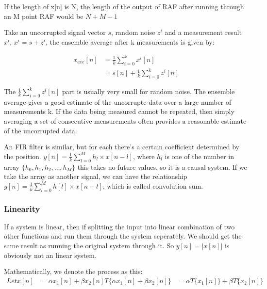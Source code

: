 \documentclass{article}
\newlength\tindent
\renewcommand{\indent}{\hspace*{\tindent}}
\begin{document}
    \noindent If the length of x[n] is N, 
    the length of the output of RAF after running through an M point RAF would be
    $N + M - 1$

    \noindent Take an uncorrupted signal vector $s$, random noise $z^{i}$ and a measurement result $x^{i}$,
    $x^{i} = s + z^{i}$, the ensemble average after k measurements is given by:

    \begin{align}
        x_{ave}[n] &= \frac{1}{k}\sum_{i=0}^{k}x^{i}[n]\\ 
                   &= s[n] + \frac{1}{k}\sum_{i=0}^{k}z^{i}[n]
    \end{align}

    The $\frac{1}{k}\sum_{i=0}^{k}z^{i}[n]$ part is usually very small for random noise. 
    The ensemble average gives a good estimate of the uncorrupte data over a large number of measurements k.
    If the data being measured cannot be repeated, then simply averaging a set of consecutive measurements
    often provides a reasonable estimate of the uncorrupted data.\\\indent

    \noindent An FIR filter is similar, but for each there's a certain coefficient determined by the position.
    $y[n] = \frac{1}{k}\sum_{l=0}^{M}{h_l \times x[n-l]}$, where $h_l$ is one of the number in array 
    $\{h_0,h_1,h_2,\dots,h_M\}$ this takes no future values, so it is a causal system. 
    If we take the array as another signal, we can have the relationship 
    $y[n] = \frac{1}{k}\sum_{l=0}^{M}{h[l] \times x[n-l]}$, which is called convolution sum.\\\indent

    \subsubsection{Linearity}

    \noindent If a system is linear, then if splitting the input into linear combination of two other functions
    and run them through the system seperately. We should get the same result as running the original system through it. 
    So $y[n] = |x[n]|$ is obviously not an linear system.\\\indent

    \noindent Mathematically, we denote the process as this:
    \begin{align}
        Let x[n] &= \alpha x_1[n] + \beta x_2[n]
        T\{\alpha x_1[n] + \beta x_2[n]\} &= \alpha T\{x_1[n]\} + \beta T\{x_2[n]\}
    \end{align}
\end{document}
